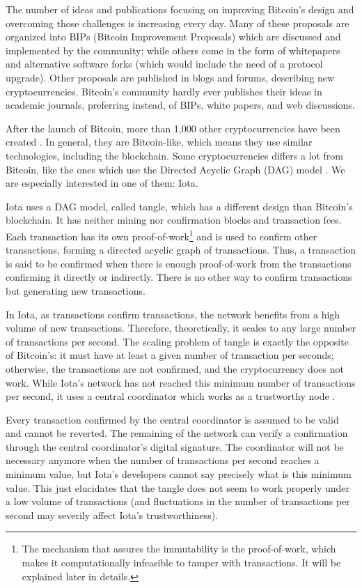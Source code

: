 The number of ideas and publications focusing on improving Bitcoin's design and overcoming those challenges is increasing every day. Many of these proposals are organized into BIPs (Bitcoin Improvement Proposals) which are discussed and implemented by the community; while others come in the form of whitepapers and alternative software forks (which would include the need of a protocol upgrade). Other proposals are published in blogs and forums, describing new cryptocurrencies. Bitcoin's community hardly ever publishes their ideas in academic journals, preferring instead, of BIPs, white papers, and web discussions.

After the launch of Bitcoin, more than 1,000 other cryptocurrencies have been created \citep{coinmarketcap}. In general, they are Bitcoin-like, which means they use similar technologies, including the blockchain. Some cryptocurrencies differs a lot from Bitcoin, like the ones which use the Directed Acyclic Graph (DAG) model \citep{dagdiscussion2014, tangle2016, dagcoin2015, sompolinsky2013, lewenberg2015, vorick2015}. We are especially interested in one of them: Iota.

Iota uses a DAG model, called tangle, which has a different design than Bitcoin's blockchain. It has neither mining nor confirmation blocks and transaction fees. Each transaction has its own proof-of-work\footnote{The mechanism that assures the immutability is the proof-of-work, which makes it computationally infeasible to tamper with transactions. It will be explained later in details.} and is used to confirm other transactions, forming a directed acyclic graph of transactions. Thus, a transaction is said to be confirmed when there is enough proof-of-work from the transactions confirming it directly or indirectly. There is no other way to confirm transactions but generating new transactions.

In Iota, as transactions confirm transactions, the network benefits from a high volume of new transactions. Therefore, theoretically, it scales to any large number of transactions per second. The scaling problem of tangle is exactly the opposite of Bitcoin's: it must have at least a given number of transaction per seconds; otherwise, the transactions are not confirmed, and the cryptocurrency does not work. While Iota's network has not reached this minimum number of transactions per second, it uses a central coordinator which works as a trustworthy node \citep{iotacoordinator}.

Every transaction confirmed by the central coordinator is assumed to be valid and cannot be reverted. The remaining of the network can verify a confirmation through the central coordinator's digital signature. The coordinator will not be necessary anymore when the number of transactions per second reaches a minimum value, but Iota's developers cannot say precisely what is this minimum value. This just elucidates that the tangle does not seem to work properly under a low volume of transactions (and fluctuations in the number of transactions per second may severily affect Iota's trustworthiness).

